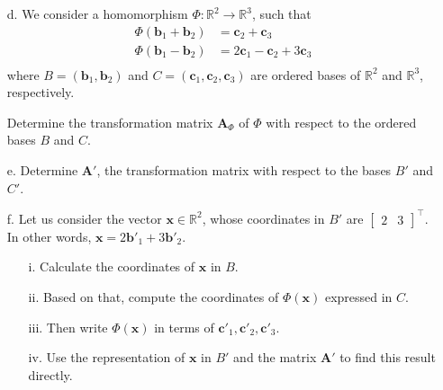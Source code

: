 \documentclass[11pt]{article}
\newcommand{\R}{\mathbb{R}}
\newcommand{\vect}[1]{\bm{#1}}      %
\newcommand{\mat}[1]{\mathbf{#1}}   %
\theoremstyle{definition}
\theoremstyle{plain}
\theoremstyle{remark}
\begin{document}
\begin{enumerate}
\begin{enumerate}
              \item[d.] We consider a homomorphism $\Phi : \R^2 \rightarrow \R^3$, such that
                    \[
                        \begin{aligned}
                            \Phi(\vect{b}_1 + \vect{b}_2) & = \vect{c}_2 + \vect{c}_3                  \\
                            \Phi(\vect{b}_1 - \vect{b}_2) & = 2 \vect{c}_1 - \vect{c}_2 + 3 \vect{c}_3 \\
                        \end{aligned}
                    \]
                    where $B = (\vect{b}_1, \vect{b}_2)$ and $C = (\vect{c}_1, \vect{c}_2, \vect{c}_3)$
                    are ordered bases of $\R^2$ and $\R^3$, respectively.

                    Determine the transformation matrix $\mat{A}_\Phi$ of $\Phi$ with respect to the ordered
                    bases $B$ and $C$.

              \item[e.] Determine $\mat{A}'$, the transformation matrix with respect to the bases $B'$ and $C'$.

              \item[f.] Let us consider the vector $\vect{x} \in \R^2$, whose coordinates in $B'$ are
                    $\begin{bmatrix}2 & 3\end{bmatrix}^{\top}$.  In other words, $\vect{x} = 2 \vect{b}'_1 + 3 \vect{b}'_2$.

                    \begin{enumerate}
                        \item[i.] Calculate the coordinates of $\vect{x}$ in $B$.
                        \item[ii.] Based on that, compute the coordinates of $\Phi(\vect{x})$ expressed in $C$.
                        \item[iii.] Then write $\Phi(\vect{x})$ in terms of $\vect{c}'_1, \vect{c}'_2, \vect{c}'_3$.
                        \item[iv.] Use the representation of $\vect{x}$ in $B'$ and the matrix $\mat{A}'$ to find this result directly.
                    \end{enumerate}

          \end{enumerate}

\end{enumerate}
\end{document}
